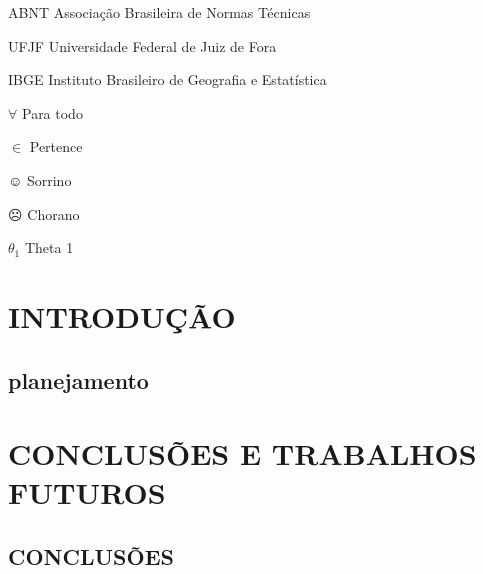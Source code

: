 \documentclass[
        12pt,
        openany, %
        oneside, %
        a4paper,			
        english,			
        brazil			        %
        ]{abntbibufjf}
\begin{document}
\listoftables*
\cleardoublepage

\begin{siglas} %
 \item[ABNT] Associa\c{c}\~ao Brasileira de Normas T\'ecnicas
 \item[UFJF] Universidade Federal de Juiz de Fora
 \item[IBGE] Instituto Brasileiro de Geografia e Estat\'istica
\end{siglas}

\begin{simbolos} %
  \item[$ \forall $] Para todo
  \item[$ \in $] Pertence
  \item[$\smiley$] Sorrino
  \item[$\frownie{}$] Chorano
  \item[$\theta_1$] Theta 1

 \end{simbolos}

 
\tableofcontents*
\cleardoublepage



\textual
\pagestyle{simple}   




\chapter{INTRODUÇÃO}  

\section{planejamento}


\chapter{CONCLUSÕES E TRABALHOS FUTUROS}

\section{CONCLUSÕES}
\end{document}
